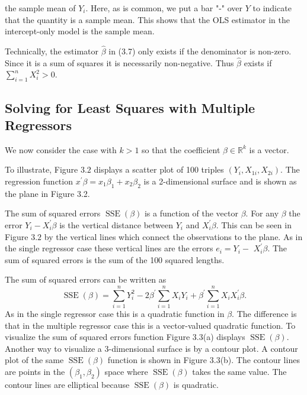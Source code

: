 \documentclass[10pt]{article}
\begin{document}
the sample mean of $Y_{i}$. Here, as is common, we put a bar "-" over $Y$ to indicate that the quantity is a sample mean. This shows that the OLS estimator in the intercept-only model is the sample mean.

Technically, the estimator $\widehat{\beta}$ in (3.7) only exists if the denominator is non-zero. Since it is a sum of squares it is necessarily non-negative. Thus $\widehat{\beta}$ exists if $\sum_{i=1}^{n} X_{i}^{2}>0$.

\subsection{Solving for Least Squares with Multiple Regressors}
We now consider the case with $k>1$ so that the coefficient $\beta \in \mathbb{R}^{k}$ is a vector.

To illustrate, Figure $3.2$ displays a scatter plot of 100 triples $\left(Y_{i}, X_{1 i}, X_{2 i}\right)$. The regression function $x^{\prime} \beta=x_{1} \beta_{1}+x_{2} \beta_{2}$ is a 2-dimensional surface and is shown as the plane in Figure 3.2.

The sum of squared errors $\operatorname{SSE}(\beta)$ is a function of the vector $\beta$. For any $\beta$ the error $Y_{i}-X_{i}^{\prime} \beta$ is the vertical distance between $Y_{i}$ and $X_{i}^{\prime} \beta$. This can be seen in Figure $3.2$ by the vertical lines which connect the observations to the plane. As in the single regressor case these vertical lines are the errors $e_{i}=Y_{i}-$ $X_{i}^{\prime} \beta$. The sum of squared errors is the sum of the 100 squared lengths.

The sum of squared errors can be written as
$$
\operatorname{SSE}(\beta)=\sum_{i=1}^{n} Y_{i}^{2}-2 \beta^{\prime} \sum_{i=1}^{n} X_{i} Y_{i}+\beta^{\prime} \sum_{i=1}^{n} X_{i} X_{i}^{\prime} \beta .
$$
As in the single regressor case this is a quadratic function in $\beta$. The difference is that in the multiple regressor case this is a vector-valued quadratic function. To visualize the sum of squared errors function Figure 3.3(a) displays $\operatorname{SSE}(\beta)$. Another way to visualize a 3-dimensional surface is by a contour plot. A contour plot of the same $\operatorname{SSE}(\beta)$ function is shown in Figure 3.3(b). The contour lines are points in the $\left(\beta_{1}, \beta_{2}\right)$ space where $\operatorname{SSE}(\beta)$ takes the same value. The contour lines are elliptical because $\operatorname{SSE}(\beta)$ is quadratic.
\end{document}

